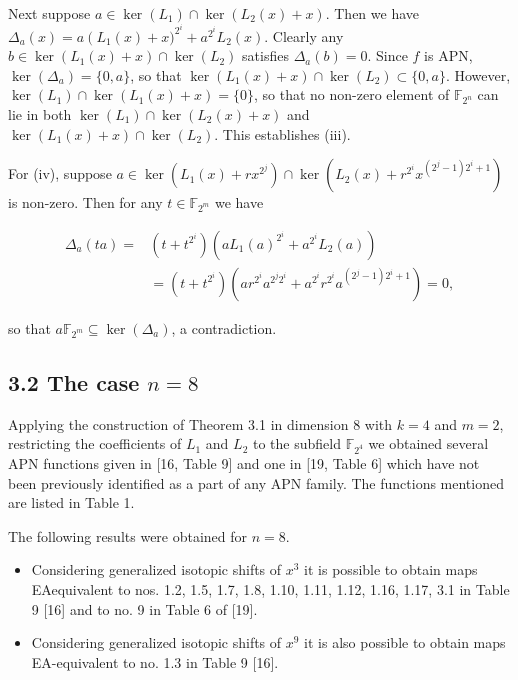\documentclass[10pt]{article}
\begin{document}
Next suppose $a \in \operatorname{ker}\left(L_{1}\right) \cap \operatorname{ker}\left(L_{2}(x)+x\right)$. Then we have $\Delta_{a}(x)=a\left(L_{1}(x)+\right. x)^{2^{i}}+a^{2^{i}} L_{2}(x)$. Clearly any $b \in \operatorname{ker}\left(L_{1}(x)+x\right) \cap \operatorname{ker}\left(L_{2}\right)$ satisfies $\Delta_{a}(b)=0$. Since $f$ is APN, $\operatorname{ker}\left(\Delta_{a}\right)=\{0, a\}$, so that $\operatorname{ker}\left(L_{1}(x)+x\right) \cap \operatorname{ker}\left(L_{2}\right) \subset\{0, a\}$. However, $\operatorname{ker}\left(L_{1}\right) \cap \operatorname{ker}\left(L_{1}(x)+x\right)=\{0\}$, so that no non-zero element of $\mathbb{F}_{2^{n}}$ can lie in both $\operatorname{ker}\left(L_{1}\right) \cap \operatorname{ker}\left(L_{2}(x)+x\right)$ and $\operatorname{ker}\left(L_{1}(x)+x\right) \cap \operatorname{ker}\left(L_{2}\right)$. This establishes (iii).

For (iv), suppose $a \in \operatorname{ker}\left(L_{1}(x)+r x^{2^{j}}\right) \cap \operatorname{ker}\left(L_{2}(x)+r^{2^{i}} x^{\left(2^{j}-1\right) 2^{i}+1}\right)$ is non-zero. Then for any $t \in \mathbb{F}_{2^{m}}$ we have

$$
\begin{aligned}
\Delta_{a}(t a)= & \left(t+t^{2^{i}}\right)\left(a L_{1}(a)^{2^{i}}+a^{2^{i}} L_{2}(a)\right) \\
& =\left(t+t^{2^{i}}\right)\left(a r^{2^{i}} a^{2^{j} 2^{i}}+a^{2^{i}} r^{2^{i}} a^{\left(2^{j}-1\right) 2^{i}+1}\right)=0,
\end{aligned}
$$

so that $a \mathbb{F}_{2^{m}} \subseteq \operatorname{ker}\left(\Delta_{a}\right)$, a contradiction.

\subsection*{3.2 The case $n=8$}
Applying the construction of Theorem 3.1 in dimension 8 with $k=4$ and $m=2$, restricting the coefficients of $L_{1}$ and $L_{2}$ to the subfield $\mathbb{F}_{2^{4}}$ we obtained several APN functions given in [16, Table 9] and one in [19, Table 6] which have not been previously identified as a part of any APN family. The functions mentioned are listed in Table 1.

The following results were obtained for $n=8$.

\begin{itemize}
  \item Considering generalized isotopic shifts of $x^{3}$ it is possible to obtain maps EAequivalent to nos. 1.2, 1.5, 1.7, 1.8, 1.10, 1.11, 1.12, 1.16, 1.17, 3.1 in Table 9 [16] and to no. 9 in Table 6 of [19].
  \item Considering generalized isotopic shifts of $x^{9}$ it is also possible to obtain maps EA-equivalent to no. 1.3 in Table 9 [16].
\end{itemize}
\end{document}

